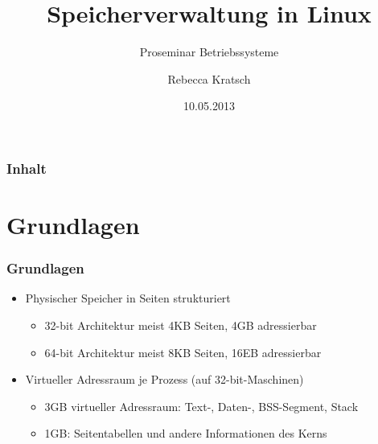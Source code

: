 \documentclass[ddcfooter,nosectionnum]{tudbeamer}
\begin{document}
\title[Speicherverwaltung in Linux]{Speicherverwaltung in Linux}
\subtitle{Proseminar Betriebssysteme}
\author{Rebecca Kratsch}

\date{10.05.2013}

\maketitle
	

\begin{frame}
    \frametitle{Inhalt}
	\tableofcontents
\end{frame}

\section{Grundlagen}
\begin{frame} 
    \frametitle{Grundlagen}
    	\begin{itemize}
			\item Physischer Speicher in Seiten strukturiert
			\begin {itemize}
				\item 32-bit Architektur meist 4KB Seiten, 4GB adressierbar
				\item 64-bit Architektur meist 8KB Seiten, 16EB adressierbar
    		\end{itemize}
			\item Virtueller Adressraum je Prozess (auf 32-bit-Maschinen)
			\begin {itemize}
				\item 3GB virtueller Adressraum: Text-, Daten-, BSS-Segment, Stack			\item 1GB: Seitentabellen und andere Informationen des Kerns    			\end{itemize}
    \end{itemize}
\end{frame}
\end{document}
